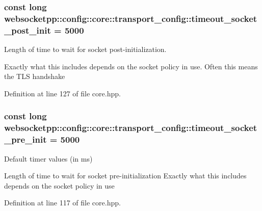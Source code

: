 \subsubsection[{timeout\+\_\+socket\+\_\+post\+\_\+init}]{\setlength{\rightskip}{0pt plus 5cm}const long websocketpp\+::config\+::core\+::transport\+\_\+config\+::timeout\+\_\+socket\+\_\+post\+\_\+init = 5000\hspace{0.3cm}{\ttfamily [static]}}\label{structwebsocketpp_1_1config_1_1core_1_1transport__config_aed4eae8f2370c532a05e51a2f006fc71}


Length of time to wait for socket post-\/initialization. 

Exactly what this includes depends on the socket policy in use. Often this means the T\+L\+S handshake 

Definition at line 127 of file core.\+hpp.

\hypertarget{structwebsocketpp_1_1config_1_1core_1_1transport__config_ab35c5322043bee05f2a66444f41a9be9}{}
\subsubsection[{timeout\+\_\+socket\+\_\+pre\+\_\+init}]{\setlength{\rightskip}{0pt plus 5cm}const long websocketpp\+::config\+::core\+::transport\+\_\+config\+::timeout\+\_\+socket\+\_\+pre\+\_\+init = 5000\hspace{0.3cm}{\ttfamily [static]}}\label{structwebsocketpp_1_1config_1_1core_1_1transport__config_ab35c5322043bee05f2a66444f41a9be9}


Default timer values (in ms) 

Length of time to wait for socket pre-\/initialization Exactly what this includes depends on the socket policy in use 

Definition at line 117 of file core.\+hpp.

\hypertarget{structwebsocketpp_1_1config_1_1core_1_1transport__config_a185b7787fb2ee6bdf8ae5391926b1665}{}
